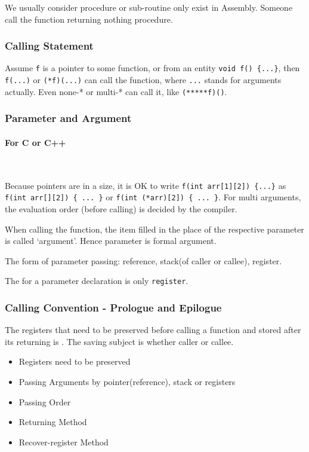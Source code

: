 
We usually consider procedure or sub-routine only exist in Assembly. %
Someone call the function returning nothing procedure. %

\subsubsection{Calling Statement}

Assume \verb`f` is a pointer to some function, or from an entity \verb`void f() {...}`, then \verb`f(...)` or \verb`(*f)(...)` can call the function, where \verb`...` stands for arguments actually. Even none-* or multi-* can call it, like \verb`(*****f)()`. %

\subsubsection{Parameter and Argument}

\paragraph{For C or C++}\

Because pointers are in a size, it is OK to write \verb`f(int arr[1][2]) {...}` as \verb`f(int arr[][2]) { ... }` or \verb`f(int (*arr)[2]) { ... }`.
For multi arguments, the evaluation order (before calling) is decided by the compiler.

When calling the function, the item filled in the place of the respective parameter is called `argument'. Hence parameter is {formal argument}.

The form of parameter passing: reference, stack(of caller or callee), register.

The  for a parameter declaration is only \verb`register`.

\subsubsection{Calling Convention \mbox{-} Prologue and Epilogue }

The registers that need to be preserved before calling a function and stored after its returning is . The saving subject is whether caller or callee.

\begin{itemize}
	\item Registers need to be preserved
	\item Passing Arguments by pointer(reference), stack or registers
	\item Passing Order
	\item Returning Method
	\item Recover-register Method
\end{itemize}

